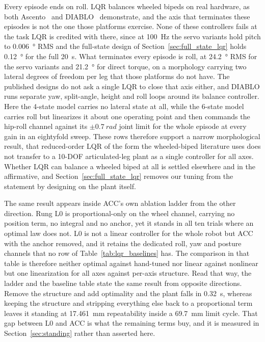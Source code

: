 \documentclass[a4paper,fleqn]{cas-dc}
\begin{document}
Every episode ends on roll. LQR balances wheeled bipeds on real hardware, as both
Ascento~\cite{klemm2019ascento} and DIABLO~\cite{diablo2024} demonstrate, and the
axis that terminates these episodes is not the one those platforms exercise. None
of these controllers fails at the task LQR is credited with there, since at
\SI{100}{Hz} the servo variants hold pitch to \SI{0.006}{\degree} RMS and the
full-state design of Section~\ref{sec:full_state_lqr} holds \SI{0.12}{\degree}
for the full \SI{20}{s}. What terminates every episode is roll, at
\SI{24.2}{\degree} RMS for the servo variants and \SI{21.2}{\degree} for direct
torque, on a morphology carrying two lateral degrees of freedom per leg that
those platforms do not have. The published designs do not ask a single LQR to
close that axis either, and DIABLO runs separate yaw, split-angle, height and
roll loops around its balance controller. Here the 4-state model carries no
lateral state at all, while the 6-state model carries roll but linearizes it
about one operating point and then commands the hip-roll channel against its
$\pm\SI{0.7}{rad}$ joint limit for the whole episode at every gain in an
eightyfold sweep. These rows therefore support a narrow morphological result,
that reduced-order LQR of the form the wheeled-biped literature uses does not
transfer to a 10-DOF articulated-leg plant as a single controller for all axes.
Whether LQR can balance a wheeled biped at all is settled elsewhere and in the
affirmative, and Section~\ref{sec:full_state_lqr} removes our tuning from the
statement by designing on the plant itself.

The same result appears inside ACC's own ablation ladder from the other
direction. Rung L0 is proportional-only on the wheel channel, carrying no
position term, no integral and no anchor, yet it stands in all ten trials where
an optimal law does not. L0 is not a linear controller for the whole robot but
ACC with the anchor removed, and it retains the dedicated roll, yaw and posture
channels that no row of Table~\ref{tab:lqr_baselines} has. The comparison in that
table is therefore neither optimal against hand-tuned nor linear against
nonlinear but one linearization for all axes against per-axis structure. Read
that way, the ladder and the baseline table state the same result from opposite
directions. Remove the structure and add optimality and the plant falls in
\SI{0.32}{s}, whereas keeping the structure and stripping everything else back to
a proportional term leaves it standing at \SI{17.461}{mm} repeatability inside a
\SI{69.7}{mm} limit cycle. That gap between L0 and ACC is what the remaining
terms buy, and it is measured in Section~\ref{sec:standing} rather than asserted
here.
\end{document}
